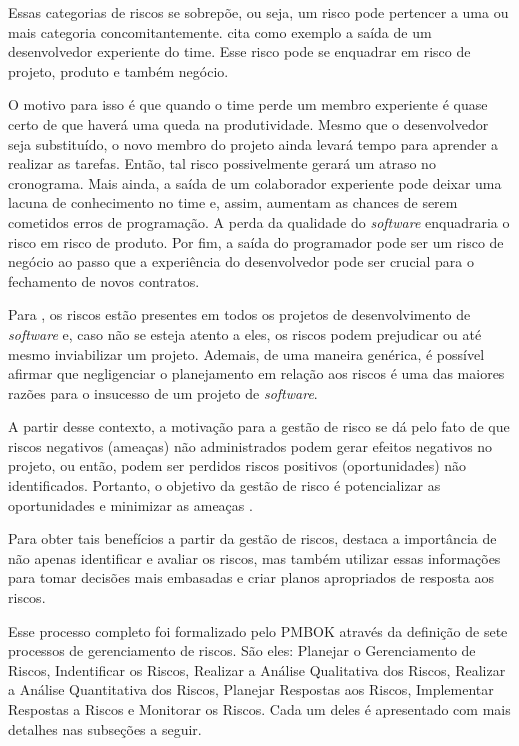 \documentclass[
    12pt,       %
    openright,      %
    twoside,      %
    a4paper,      %
    english,      %
    french,       %
    spanish,      %
    brazil,       %
    ]{abntex2}
\begin{document}
Essas categorias de riscos se sobrepõe, ou seja, um risco pode pertencer a uma ou mais categoria concomitantemente.  cita como exemplo a saída de um desenvolvedor experiente do time. Esse risco pode se enquadrar em risco de projeto, produto e também negócio. 

O motivo para isso é que quando o time perde um membro experiente é quase certo de que haverá uma queda na produtividade. Mesmo que o desenvolvedor seja substituído, o novo membro do projeto ainda levará tempo para aprender a realizar as tarefas. Então, tal risco possivelmente gerará um atraso no cronograma. Mais ainda, a saída de um colaborador experiente pode deixar uma lacuna de conhecimento no time e, assim, aumentam as chances de serem cometidos erros de programação. A perda da qualidade do \textit{software} enquadraria o risco em risco de produto. Por fim, a saída do programador pode ser um risco de negócio ao passo que a experiência do desenvolvedor pode ser crucial para o fechamento de novos contratos.

Para , os riscos estão presentes em todos os projetos de desenvolvimento de \textit{software} e, caso não se esteja atento a eles, os riscos podem prejudicar ou até mesmo inviabilizar um projeto. Ademais, de uma maneira genérica, é possível afirmar que negligenciar o planejamento em relação aos riscos é uma das maiores razões para o insucesso de um projeto de \textit{software}.

A partir desse contexto, a motivação para a gestão de risco se dá pelo fato de que riscos negativos (ameaças) não administrados podem gerar efeitos negativos no projeto, ou então, podem ser perdidos riscos positivos (oportunidades) não identificados. Portanto, o objetivo da gestão de risco é potencializar as oportunidades e minimizar as ameaças \cite{PMBOK:2017}.

Para obter tais benefícios a partir da gestão de riscos,  destaca a importância de não apenas identificar e avaliar os riscos, mas também utilizar essas informações para tomar decisões mais embasadas e criar planos apropriados de resposta aos riscos. 

Esse processo completo foi formalizado pelo PMBOK \cite{PMBOK:2017} através da definição de sete processos de gerenciamento de riscos. São eles: Planejar o Gerenciamento de Riscos, Indentificar os Riscos, Realizar a Análise Qualitativa dos Riscos, Realizar a Análise Quantitativa dos Riscos, Planejar Respostas aos Riscos, Implementar Respostas a Riscos e Monitorar os Riscos. Cada um deles é apresentado com mais detalhes nas subseções a seguir.
\end{document}
